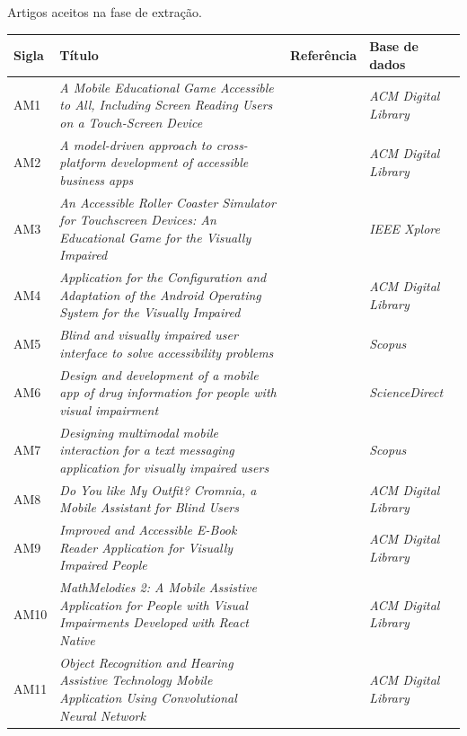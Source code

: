 \begin{quadro}[htb!]
\caption{\label{qua-art-ext}Artigos aceitos na fase de extração.}
\begin{tabular}{|m{1.0cm} | m{8.1cm} | m{2.6cm} | m{2.5cm}|}
    \hline
    \textbf{Sigla} &\textbf{Título} & \textbf{Referência} & \textbf{Base de dados} \\ \hline
    AM1 & \emph{A Mobile Educational Game Accessible to All, Including Screen Reading Users on a Touch-Screen Device} & \cite{Leporini2017} & \emph{ACM Digital Library} \\ \hline
    AM2 & \emph{A model-driven approach to cross-platform development of accessible business apps} & \cite{Christoph2020} & \emph{ACM Digital Library} \\ \hline
    AM3 & \emph{An Accessible Roller Coaster Simulator for Touchscreen Devices: An Educational Game for the Visually Impaired} & \cite{Biase2018} & \emph{IEEE Xplore} \\ \hline
    AM4 & \emph{Application for the Configuration and Adaptation of the Android Operating System for the Visually Impaired} & \cite{Oliveira2018} & \emph{ACM Digital Library} \\ \hline
    AM5 & \emph{Blind and visually impaired user interface to solve accessibility problems} & \cite{Shera2021285} & \emph{Scopus} \\ \hline
    AM6 & \emph{Design and development of a mobile app of drug information for people with visual impairment} & \cite{Amariles2020} & \emph{ScienceDirect} \\ \hline
    AM7 & \emph{Designing multimodal mobile interaction for a text messaging application for visually impaired users} & \cite{Duarte2017} & \emph{Scopus} \\ \hline
    AM8 & \emph{Do You like My Outfit? Cromnia, a Mobile Assistant for Blind Users} & \cite{Giuliana2018} & \emph{ACM Digital Library} \\ \hline
    AM9 & \emph{Improved and Accessible E-Book Reader Application for Visually Impaired People} & \cite{Heesook2017} & \emph{ACM Digital Library} \\ \hline
    AM10 & \emph{MathMelodies 2: A Mobile Assistive Application for People with Visual Impairments Developed with React Native} & \cite{Ducci2018} & \emph{ACM Digital Library} \\ \hline
    AM11 & \emph{Object Recognition and Hearing Assistive Technology Mobile Application Using Convolutional Neural Network} & \cite{Caballero2020} & \emph{ACM Digital Library} \\ \hline

\end{tabular}
\end{quadro}
